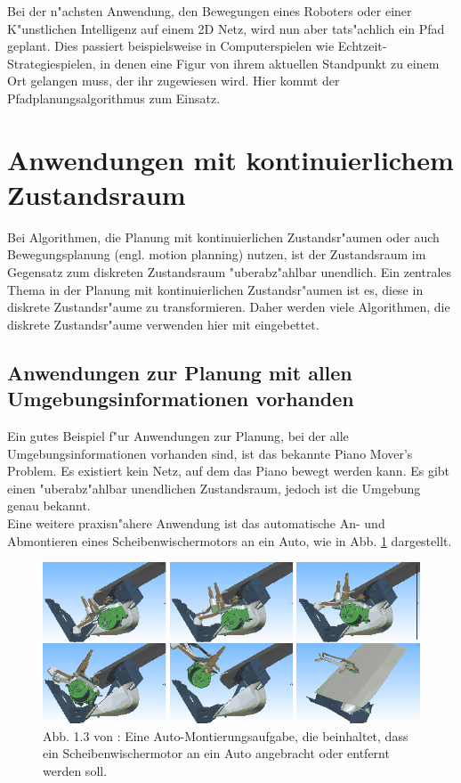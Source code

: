 Bei der n"achsten Anwendung, den Bewegungen eines Roboters oder einer K"unstlichen Intelligenz auf einem 2D Netz, wird nun aber tats"achlich ein Pfad geplant. Dies passiert beispielsweise in Computerspielen wie Echtzeit-Strategiespielen, in denen eine Figur von ihrem aktuellen Standpunkt zu einem Ort gelangen muss, der ihr zugewiesen wird. Hier kommt der Pfadplanungsalgorithmus zum Einsatz.\\
\section{Anwendungen mit kontinuierlichem Zustandsraum}
Bei Algorithmen, die Planung mit kontinuierlichen Zustandsr"aumen oder auch Bewegungsplanung (engl. motion planning) nutzen, ist der Zustandsraum im Gegensatz zum diskreten Zustandsraum "uberabz"ahlbar unendlich. Ein zentrales Thema in der Planung mit kontinuierlichen Zustandsr"aumen ist es, diese in diskrete Zustandsr"aume zu transformieren. Daher werden viele Algorithmen, die diskrete Zustandsr"aume verwenden hier mit eingebettet. 
\subsection{Anwendungen zur Planung mit allen Umgebungsinformationen vorhanden}
Ein gutes Beispiel f"ur Anwendungen zur Planung, bei der alle Umgebungsinformationen vorhanden sind, ist das bekannte Piano Mover's Problem. Es existiert kein Netz, auf dem das Piano bewegt werden kann. Es gibt einen "uberabz"ahlbar unendlichen Zustandsraum, jedoch ist die Umgebung genau bekannt.\\
Eine weitere praxisn"ahere Anwendung ist das automatische An- und Abmontieren eines Scheibenwischermotors an ein Auto, wie in Abb. \ref{Abb. 5.2} dargestellt.
\begin{figure}
	\centering
	\includegraphics[width=0.7\linewidth]{images/img231}
	\caption{Abb. 1.3 von \cite[~S. 7]{Lav06}: Eine Auto-Montierungsaufgabe, die beinhaltet, dass ein Scheibenwischermotor an ein Auto angebracht oder entfernt werden soll.}
	\label{Abb. 5.2}
\end{figure}

